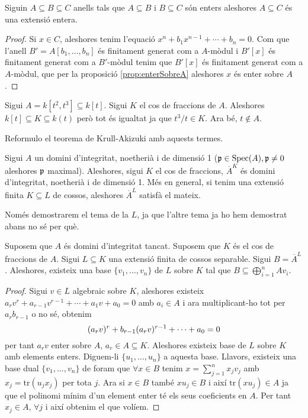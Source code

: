 \documentclass[../../../main.tex]{subfiles}
\begin{document}
\begin{coro}
\label{coro:extensioEnteraTriple} Siguin $A\subseteq B\subseteq C$ anells tals que $A\subseteq B$ i $B\subseteq C$ són enters aleshores $A\subseteq C$ és una extensió entera.
\end{coro}
\begin{proof}
Si
$x\in C$,
aleshores tenim l'equació 
$x^n+b_1x^{n-1}+\cdots+b_n = 0$.
Com que l'anell 
$B'=A[b_1,\ldots,b_n]$
és finitament generat com a 
$A$-mòdul
i $B'[x]$ és finitament generat com a 
$B'$-mòdul
tenim que $B'[x]$
és finitament generat com a $A$-mòdul,
que per la proposició \ref{prop:enterSobreA} aleshores $x$ és enter sobre $A$.
\end{proof}

\begin{ej}
Sigui $A = k[t^2,t^3]\subseteq k[t]$. Sigui $K$ el cos de fraccions de $A$. Aleshores $k[t]\subseteq K\subseteq k(t)$ però tot és igualtat ja que $t^3/t\in K$. Ara bé, $t\not\in A$.
\end{ej}

Reformulo el teorema de Krull-Akizuki amb aquests termes.

\begin{ter}
 Sigui $A$ un domini d'integritat, noetherià i de dimensió 1 ($\mathfrak{p}\in\mathrm{Spec}(A),\mathfrak{p}\neq 0$ aleshores $\mathfrak{p}$ maximal). Aleshores, sigui $K$ el cos de fraccions, $\overline{A}^K$ és domini d'integritat, noetherià i de dimensió 1. Més en general, si tenim una extensió finita $K\subseteq L$ de cossos, aleshores $\overline{A}^L$ satisfà el mateix.
\end{ter}

Només demostrarem el tema de la $L$, ja que l'altre tema ja ho hem demostrat abans no sé per què.

\begin{ter}
Suposem que $A$ és domini d'integritat tancat. Suposem que $K$ és el cos de fraccions de $A$. Sigui $L\subseteq K$ una extensió finita de cossos separable. Sigui $B = \overline{A}^L$. Aleshores, existeix una base $\{v_1,\ldots,v_n\}$ de $L$ sobre $K$ tal que $B\subseteq \bigoplus_{i=1}^nAv_i$.
\end{ter}
\begin{proof}
Sigui $v\in L$ algebraic sobre $K$, aleshores existeix $a_rv^r+a_{r-1}v^{r-1}+\cdots+a_1v+a_0 = 0$ amb $a_i\in A$ i ara multiplicant-ho tot per $a_rb_{r-1}$ o no sé, obtenim
\begin{equation}
    \notag
    (a_rv)^r+b_{r-1}(a_rv)^{r-1}+\cdots+a_0 = 0
\end{equation}
per tant $a_rv$ enter sobre $A$, $a_r\in A\subseteq K$. Aleshores existeix base de $L$ sobre $K$ amb elements enters. Diguem-li $\{u_1,\ldots,u_n\}$ a aquesta base. Llavors, existeix una base dual $\{v_1,\ldots,v_n\}$ de foram que $\forall x\in B$ tenim $x = \sum_{j=1}^nx_jv_j$ amb $x_j = \mathrm{tr}(u_jx_j)$ per tota $j$. Ara si $x\in B$ també $xu_j\in B$ i així $\mathrm{tr}(xu_j)\in A$ ja que el polinomi mínim d'un element enter té els seus coeficients en $A$. Per tant $x_j\in A$, $\forall j$ i així obtenim el que volíem.
\end{proof}
\end{document}
